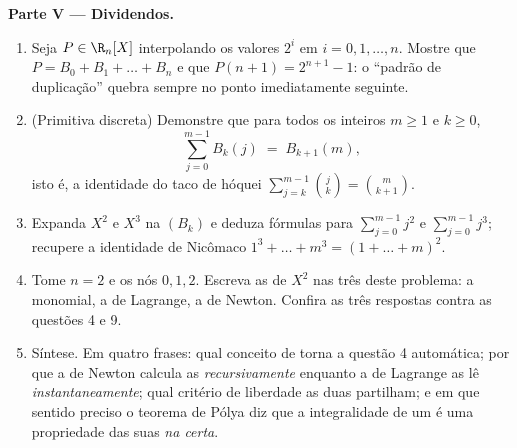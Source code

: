 \begin{problem}
\medskip
\noindent\textbf{Parte V --- Dividendos.}
\begin{enumerate}[resume]
  \item Seja $P \in \R_n[X]$ interpolando os valores $2^i$ em $i =
        0, 1, \dots, n$. Mostre
        que $P = B_0 + B_1 + \dots + B_n$ e que $P(n + 1) = 2^{n+1} - 1$: o ``padrão de duplicação'' quebra
        sempre no ponto imediatamente seguinte.
  \item (Primitiva discreta) Demonstre que para todos os inteiros
        $m
        \geq 1$ e $k \geq 0$,
        \[
        \sum_{j=0}^{m-1} B_k(j) \;=\; B_{k+1}(m),
        \]
        isto é, a identidade do taco de hóquei $\sum_{j=k}^{m-1}
        \binom{j}{k} = \binom{m}{k+1}$.
  \item Expanda $X^2$ e $X^3$ na  $(B_k)$ e deduza fórmulas
         para $\sum_{j=0}^{m-1} j^2$ e $\sum_{j=0}^{m-1} j^3$; recupere a identidade de
        Nicômaco $1^3 + \dots + m^3 = (1 + \dots + m)^2$.
  \item Tome $n = 2$ e os nós $0, 1, 2$. Escreva as  de
        $X^2$ nas três  deste problema: a  monomial, a
         de Lagrange, a  de Newton. Confira as três
        respostas contra as questões 4 e 9.
  \item Síntese. Em quatro frases: qual conceito de 
        torna a questão 4 automática; por que a  de Newton
        calcula as  \emph{recursivamente} enquanto a
         de Lagrange as lê \emph{instantaneamente}; qual
        critério de liberdade as duas  partilham; e em que
        sentido preciso o teorema de Pólya diz que a integralidade
        de um  é uma propriedade das suas 
        \emph{na  certa}.
\end{enumerate}
\end{problem}
